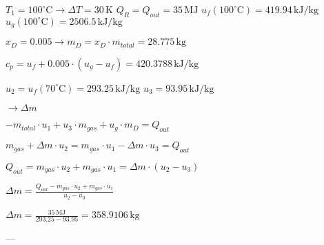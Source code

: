 \( T_1 = 100^\circ \text{C} \rightarrow \Delta T = 30 \, \text{K} \)  
\( Q_R = Q_{out} = 35 \, \text{MJ} \)  
\( u_f(100^\circ \text{C}) = 419.94 \, \text{kJ/kg} \)  
\( u_g(100^\circ \text{C}) = 2506.5 \, \text{kJ/kg} \)  

\( x_D = 0.005 \rightarrow m_{D} = x_D \cdot m_{total} = 28.775 \, \text{kg} \)  

\( c_p = u_f + 0.005 \cdot (u_g - u_f) = 420.3788 \, \text{kJ/kg} \)  

\( u_2 = u_f(70^\circ \text{C}) = 293.25 \, \text{kJ/kg} \)  
\( u_3 = 93.95 \, \text{kJ/kg} \)  

\( \rightarrow \Delta m \)  

\( -m_{total} \cdot u_1 + u_3 \cdot m_{gas} + u_g \cdot m_D = Q_{out} \)  

\( m_{gas} + \Delta m \cdot u_2 = m_{gas} \cdot u_1 - \Delta m \cdot u_3 = Q_{out} \)  

\( Q_{out} = m_{gas} \cdot u_2 + m_{gas} \cdot u_1 = \Delta m \cdot (u_2 - u_3) \)  

\( \Delta m = \frac{Q_{out} - m_{gas} \cdot u_2 + m_{gas} \cdot u_1}{u_2 - u_3} \)  

\( \Delta m = \frac{35 \, \text{MJ}}{293.25 - 93.95} = 358.9106 \, \text{kg} \)  

---